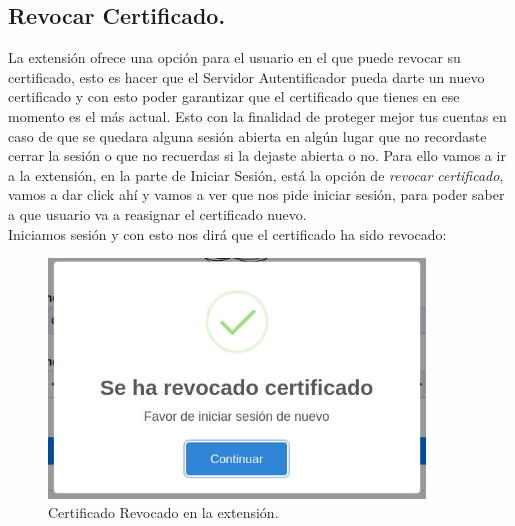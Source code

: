 \documentclass[12pt, a4paper, titlepage]{report}
\begin{document}
	\subsection{Revocar Certificado.}
        La extensión ofrece una opción para el usuario en el que puede revocar su certificado, esto es hacer que el Servidor Autentificador pueda darte un nuevo certificado y con esto poder garantizar que el certificado que tienes en ese momento es el más actual. Esto con la finalidad de proteger mejor tus cuentas en caso de que se quedara alguna sesión abierta en algún lugar que no recordaste cerrar la sesión o que no recuerdas si la dejaste abierta o no. Para ello vamos a ir a la extensión, en la parte de Iniciar Sesión, está la opción de \textit{revocar certificado}, vamos a dar click ahí y vamos a ver que nos pide iniciar sesión, para poder saber a que usuario va a reasignar el certificado nuevo.\\
        
        Iniciamos sesión y con esto nos dirá que el certificado ha sido revocado: 
        \begin{figure}[H]
    		\begin{center}	
    		\includegraphics[width=10cm]{imagenes/Revocacion/certRevocado.jpg}
    		\caption{Certificado Revocado en la extensión.}
    		\label{fig:certRevocado}
    		\end{center}
    	\end{figure}
    	
\end{document}
